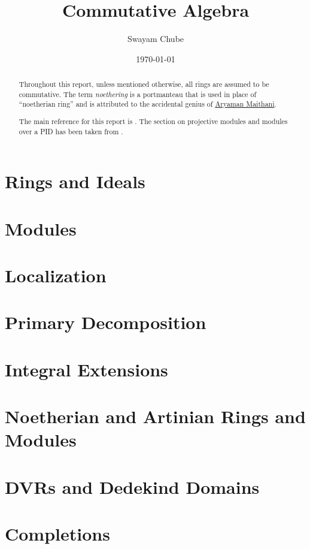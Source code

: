 \documentclass[oneside]{report}
\title{Commutative Algebra}
\author{Swayam Chube}
\date{\today}
\begin{document}
\maketitle

\begin{abstract}
    Throughout this report, unless mentioned otherwise, all rings are assumed to be commutative. The term \textit{noethering} is a portmanteau that is used in place of ``noetherian ring'' and is attributed to the accidental genius of \href{https://youtu.be/RrjJfyEF7Ak?t=1259}{Aryaman Maithani}.

    The main reference for this report is \cite{AM69}. The section on projective modules and modules over a PID has been taken from \cite{Lan02}.
\end{abstract}

\tableofcontents


\chapter{Rings and Ideals}


\chapter{Modules}


\chapter{Localization}


\chapter{Primary Decomposition}


\chapter{Integral Extensions}


\chapter{Noetherian and Artinian Rings and Modules}


\chapter{DVRs and Dedekind Domains}


\chapter{Completions}




\end{document}

